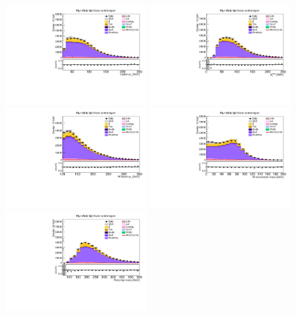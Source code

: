 \begin{figure}[tbp]
  \begin{center}
    \includegraphics[width=0.48\textwidth]{figures/wlnhbb2016/resolved/WmnWHLightFlavorCR_lepton1Pt.pdf}
    \includegraphics[width=0.48\textwidth]{figures/wlnhbb2016/resolved/WmnWHLightFlavorCR_pfmet.pdf}
    \includegraphics[width=0.48\textwidth]{figures/wlnhbb2016/resolved/WmnWHLightFlavorCR_WpT.pdf}
    \includegraphics[width=0.48\textwidth]{figures/wlnhbb2016/resolved/WmnWHLightFlavorCR_mTW.pdf}
    \includegraphics[width=0.48\textwidth]{figures/wlnhbb2016/resolved/WmnWHLightFlavorCR_topMassLep1Met.pdf}

\end{center}
\end{figure}
